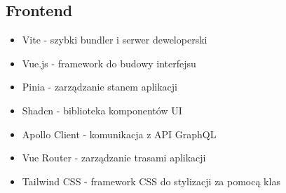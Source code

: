 \documentclass{article}
\begin{document}
        \subsection{Frontend}
        \begin{itemize}
            \item Vite - szybki bundler i serwer deweloperski
            \item Vue.js - framework do budowy interfejsu
            \item Pinia - zarządzanie stanem aplikacji
            \item Shadcn - biblioteka komponentów UI
            \item Apollo Client - komunikacja z API GraphQL
            \item Vue Router - zarządzanie trasami aplikacji
            \item Tailwind CSS - framework CSS do stylizacji za pomocą klas
        \end{itemize}
\end{document}
